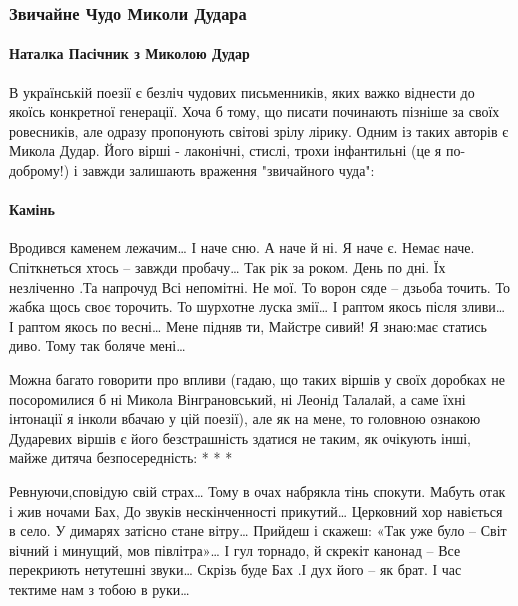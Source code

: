  
 
 

\subsubsection{Звичайне Чудо Миколи Дудара}

\paragraph{Наталка Пасічник з Миколою Дудар}

В українській поезії є безліч чудових письменників, яких важко віднести до
якоїсь конкретної генерації. Хоча б тому, що писати починають пізніше за своїх
ровесників, але одразу пропонують світові зрілу лірику. Одним із таких авторів
є Микола Дудар. Його вірші - лаконічні, стислі, трохи інфантильні (це я
по-доброму!) і завжди залишають враження "звичайного чуда":

\paragraph{Камінь}

Вродився каменем лежачим…
І наче сню. А наче й ні.
Я наче є. Немає наче.
Спіткнеться хтось -- завжди пробачу…
Так рік за роком. День по дні.
Їх незліченно .Та напрочуд
Всі непомітні. Не мої.
То ворон сяде -- дзьоба точить.
То жабка щось своє торочить.
То шурхотне луска змії…
І раптом якось після зливи…
І раптом якось по весні…
Мене підняв ти, Майстре сивий!
Я знаю:має статись диво.
Тому так боляче мені…

Можна багато говорити про впливи (гадаю, що таких віршів у своїх доробках не
посоромилися б ні Микола Вінграновський, ні Леонід Талалай, а саме їхні
інтонації я інколи вбачаю у цій поезії), але як на мене, то головною ознакою
Дударевих віршів є його безстрашність здатися не таким, як очікують інші, майже
дитяча безпосередність:
* * *

Ревнуючи,сповідую свій страх…
Тому в очах набрякла тінь спокути.
Мабуть отак і жив ночами Бах,
До звуків нескінченності прикутий…
Церковний хор навіється в село.
У димарях затісно стане вітру…
Прийдеш і скажеш: «Так уже було --
Світ вічний і минущий, мов півлітра»…
І гул торнадо, й скрекіт канонад –
Все перекриють нетутешні звуки…
Скрізь буде Бах .І дух його – як брат.
І час тектиме нам з тобою в руки…

